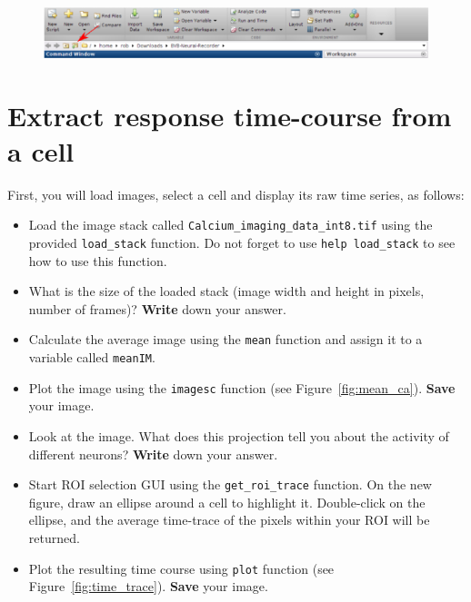 \documentclass[paper=a4, fontsize=11pt]{article} %
\numberwithin{equation}{section} %
\numberwithin{figure}{section} %
\numberwithin{table}{section} %
\begin{document}
\begin{figure}
    \centering
    \includegraphics[width=\textwidth]{change_dir.eps}
    \caption{}
    \label{fig:toolbar}
\end{figure}


\section{Extract response time-course from a cell}

First, you will load images, select a cell and display its raw time series, as follows:

\begin{itemize}
\item Load the image stack called \texttt{Calcium\_imaging\_data\_int8.tif} using the provided \texttt{load\_stack} function.
  Do not forget to use \texttt{help load\_stack} to see how to use this function.
\item What is the size of the loaded stack (image width and height in pixels, number of frames)? \textbf{Write} down your answer.
  \vspace{1em}
\item Calculate the average image using the \texttt{mean} function and assign it to a variable called \texttt{meanIM}.
\item Plot the image using the \texttt{imagesc} function (see Figure~\ref{fig:mean_ca}). \textbf{Save} your image.
\item Look at the image. What does this projection tell you about the activity of different neurons? \textbf{Write} down your answer.
  \vspace{2em}
\item Start ROI selection GUI using the \texttt{get\_roi\_trace} function. On the new figure, draw an ellipse around a cell to highlight it. Double-click on the ellipse, and the average time-trace of the pixels within your ROI will be returned.
\item Plot the resulting time course using \texttt{plot} function (see Figure~\ref{fig:time_trace}). \textbf{Save} your image.
\end{itemize}
\end{document}
